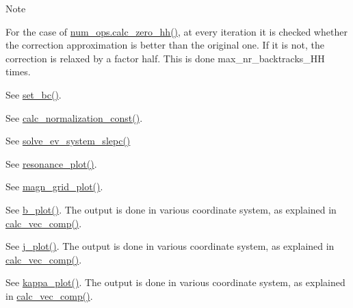 \begin{DoxyNote}{Note}
\begin{DoxyEnumerate}
\item \label{page_inputs_fni9}%
%
For the case of \hyperlink{interfacenum__ops_1_1calc__zero__hh}{num\+\_\+ops.\+calc\+\_\+zero\+\_\+hh()}, at every iteration it is checked whether the correction approximation is better than the original one. If it is not, the correction is relaxed by a factor half. This is done {\ttfamily max\+\_\+nr\+\_\+backtracks\+\_\+\+HH} times.
\item \label{page_inputs_fni10}%
%
See \hyperlink{namespaceslepc__ops_a05f8a23335ed47ad1996cddf3bcfdc2e}{set\+\_\+bc()}.
\item \label{page_inputs_fni11}%
%
See \hyperlink{namespaceeq__ops_a0f755ba26015cd542aa3209dcb80013d}{calc\+\_\+normalization\+\_\+const()}.
\item \label{page_inputs_fni12}%
%
See \hyperlink{namespaceslepc__ops_a79c420987056c225931b51c8d30ece1f}{solve\+\_\+ev\+\_\+system\+\_\+slepc()}
\item \label{page_inputs_fni13}%
%
See \hyperlink{namespacex__ops_abdaf1308e13cede3a153e8c6cf35a637}{resonance\+\_\+plot()}.
\item \label{page_inputs_fni14}%
%
See \hyperlink{namespacegrid__ops_addd76b7b3be0b51e0863ae0cdfef41e6}{magn\+\_\+grid\+\_\+plot()}.
\item \label{page_inputs_fni15}%
%
See \hyperlink{namespaceeq__ops_a5591339a686f1c8591c4b43f40b15065}{b\+\_\+plot()}. The output is done in various coordinate system, as explained in \hyperlink{namespacegrid__utilities_ad3d9386b9abcb1a7e17369a1b3a3750d}{calc\+\_\+vec\+\_\+comp()}.
\item \label{page_inputs_fni16}%
%
See \hyperlink{namespaceeq__ops_a3064af9c961507ba68e5647b7b1a8d9c}{j\+\_\+plot()}. The output is done in various coordinate system, as explained in \hyperlink{namespacegrid__utilities_ad3d9386b9abcb1a7e17369a1b3a3750d}{calc\+\_\+vec\+\_\+comp()}.
\item \label{page_inputs_fni17}%
%
See \hyperlink{namespaceeq__ops_a6a073d160b1e0918ea4cde3b439a2277}{kappa\+\_\+plot()}. The output is done in various coordinate system, as explained in \hyperlink{namespacegrid__utilities_ad3d9386b9abcb1a7e17369a1b3a3750d}{calc\+\_\+vec\+\_\+comp()}.
\item \label{page_inputs_fni18}%
%

\end{DoxyEnumerate}
\end{DoxyNote}
